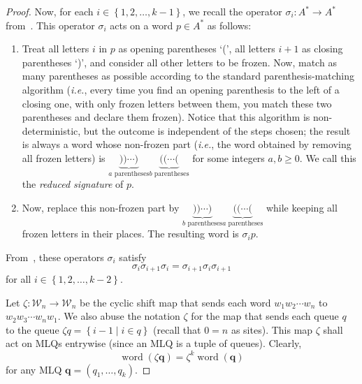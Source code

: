\documentclass[reqno]{amsart}
\newcommand{\0}{\phantom{c}}
\newcommand{\qq}{\mathbf{q}}
\newcommand{\mcW}{\mathcal{W}}
\newenvironment{verlong}{}{}
\newcommand{\word}{\operatorname{word}}
\newcommand{\set}[1]{\left\{ #1 \right\}}
\newcommand{\tup}[1]{\left( #1 \right)}
\newcommand{\defn}[1]{{\color{darkred}\emph{#1}}} %
\theoremstyle{plain}
\theoremstyle{definition}
\numberwithin{equation}{section}
\begin{document}
\begin{verlong}
\begin{proof}
Now, for each $i \in \set{1, 2, \ldots, k-1}$, we recall the operator
$\sigma_i \colon A^* \to A^*$ from~\cite[\S5.5]{Loth}.
This operator $\sigma_i$ acts on a word $p \in A^*$ %
as follows:
\begin{enumerate}
 \item Treat all letters $i$ in $p$ as opening parentheses `(',
       all letters $i+1$ as closing parentheses `)',
       and consider all other letters to be frozen.
       Now, match as many parentheses as possible
       according to the standard parenthesis-matching
       algorithm (\textit{i.e.}, every time you find an opening
       parenthesis to the left of a closing one, with only
       frozen letters between them, you match these two
       parentheses and declare them frozen).
       Notice that this algorithm is non-deterministic, but
       the outcome is independent of the steps chosen;
       the result is always a word whose non-frozen
       part (\textit{i.e.}, the word obtained by removing
       all frozen letters) is
       $\underbrace{))\cdots)}_{a\text{ parentheses}}
       \underbrace{((\cdots(}_{b\text{ parentheses}}$
       for some integers $a, b \geq 0$.
       We call this the \defn{reduced signature} of $p$.
 \item Now, replace this non-frozen part by
       $\underbrace{))\cdots)}_{b\text{ parentheses}}
       \underbrace{((\cdots(}_{a\text{ parentheses}}$
       while keeping all frozen letters in their places.
       The resulting word is $\sigma_i p$.
\end{enumerate}
From~\cite[Eq.~(5.6.3)]{Loth}, these operators
$\sigma_i$ satisfy
\begin{equation}
 \sigma_i \sigma_{i+1} \sigma_i
 = \sigma_{i+1} \sigma_i \sigma_{i+1}
 \label{pf.prop:braid.loth-eq-old6}
\end{equation}
for all $i \in \set{1, 2, \ldots, k-2}$.

Let $\zeta \colon \mcW_n \to \mcW_n$ be the cyclic shift map that sends each word $w_1 w_2 \cdots w_n$ to $w_2 w_3 \cdots w_n w_1$.
We also abuse the notation $\zeta$ for the map that sends each queue $q$ to the queue $\zeta q = \set{ i - 1 \mid i \in q }$ (recall that $0 = n$ as sites).
This map $\zeta$ shall act on MLQs entrywise (since an MLQ is a tuple of queues).
Clearly,
\begin{equation}
 \word(\zeta \qq) = \zeta^k \word(\qq)
 \label{pf.prop:braid.word-zeta-old6}
\end{equation}
for any MLQ $\qq = (q_1, \ldots, q_k)$.


\end{proof}
\end{verlong}
\end{document}
